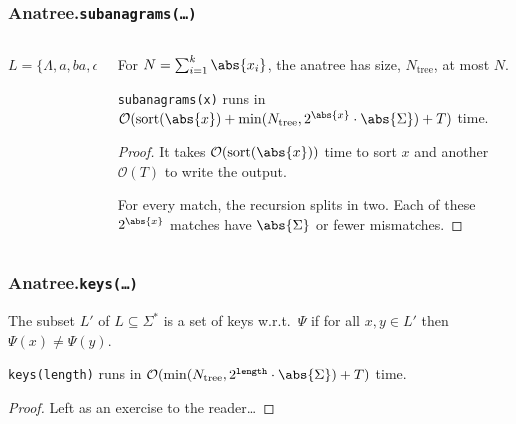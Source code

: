 \documentclass[english, aspectratio=169]{beamer}
\newcommand{\sort}[1]{\text{sort}(#1)}
\newcommand{\Oh}[1]{\ensuremath{\mathcal{O}(#1)}}
\begin{document}
\begin{frame}
  \frametitle{Anatree.\texttt{subanagrams(\dots)}}

  \begin{columns}
    \begin{column}{0.55\textwidth}
      \centering

      \begin{tikzpicture}
        
      \end{tikzpicture}

      $L = \{ \Lambda, a, ba, ca, aba, baa \}$
    \end{column}
    \begin{column}{0.45\textwidth}
      \small

      \begin{lemma}
        For $N = \sum_{i = 1}^k \abs{x_i}$, the anatree has size, $N_{\text{tree}}$, at most $N$.
      \end{lemma}

      \pause

      \begin{theorem}
        \texttt{subanagrams(x)} runs in\\
        $\Oh{\sort{\abs{x}} + \min(N_{\text{tree}}, 2^{\abs{x}} \cdot \abs{\Sigma}) + T}$ time.
      \end{theorem}
      \begin{proof}
        It takes $\Oh{\sort{\abs{x}}}$ time to sort $x$ and another $\Oh{T}$ to write the output.

        For every match, the recursion splits in two. Each of these
        $2^{\abs{x}}$ matches have $\abs{\Sigma}$ or fewer mismatches.
      \end{proof}
    \end{column}
  \end{columns}
\end{frame}

\begin{frame}
  \frametitle{Anatree.\texttt{keys(\dots)}}

  \begin{definition}
    The subset $L'$ of $L \subseteq \Sigma^*$ is a set of keys w.r.t.\ $\Psi$ if for all
    $x, y \in L'$ then $\Psi(x) \neq \Psi(y)$.
  \end{definition}

  \vspace{30pt}
  \pause

  \centering
  \begin{minipage}{.74\textwidth\relax}
    \large

    \begin{theorem}
      \texttt{keys(length)} runs in $\Oh{\min(N_{\text{tree}}, 2^{\texttt{length}} \cdot \abs{\Sigma}) + T}$ time.
    \end{theorem}
    \begin{proof}
      Left as an exercise to the reader\dots
    \end{proof}

  \end{minipage}
\end{frame}
\end{document}
